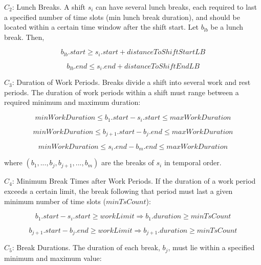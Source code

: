 $C_2$: Lunch Breaks. A shift $s_i$ can have several lunch breaks, each required to last a specified number of time slots (min lunch break duration), and should be located within a certain time window after the shift start. Let $b_{lb}$ be a lunch break. Then,

\begin{equation}
b_{lb}.start \ge s_i.start + distanceToShiftStartLB
\end{equation}

\begin{equation}
b_{lb}.end \le s_i.end + distanceToShiftEndLB
\end{equation}

$C_3$: Duration of Work Periods. Breaks divide a shift into several work and rest periods. The duration of work periods within a shift must range between a required minimum and maximum duration:

\begin{equation}
minWorkDuration \le b_1.start - s_i.start \le maxWorkDuration
\end{equation}

\begin{equation}
minWorkDuration \le b_{j+1}.start - b_j.end \le maxWorkDuration
\end{equation}

\begin{equation}
minWorkDuration \le s_i.end - b_m.end  \le maxWorkDuration
\end{equation}

where $(b_1,...,b_j,b_{j+1},...,b_m)$ are the breaks of $s_i$ in temporal order.

$C_4$: Minimum Break Times after Work Periods. If the duration of a work period exceeds a certain limit, the break following that period must last a given minimum number of time slots ($minTsCount$):

\begin{equation}
 b_1.start - s_i.start \ge workLimit  \Rightarrow b_1.duration \ge minTsCount
\end{equation}

\begin{equation}
 b_{j+1}.start - b_j.end \ge workLimit  \Rightarrow b_{j+1}.duration \ge minTsCount
\end{equation}



$C_5$: Break Durations. The duration of each break, $b_j$, must lie within a specified minimum and maximum value:

